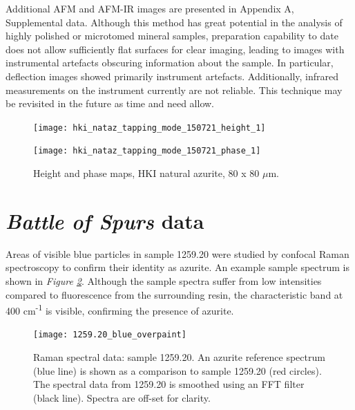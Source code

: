 Additional AFM and AFM-IR images are presented in Appendix A, Supplemental data. Although this method has great potential in the analysis of highly polished or microtomed mineral samples, preparation capability to date does not allow sufficiently flat surfaces for clear imaging, leading to images with instrumental artefacts obscuring information about the sample. In particular, deflection images showed primarily instrument artefacts. Additionally, infrared measurements on the instrument currently are not reliable. This technique may be revisited in the future as time and need allow.

\begin{figure}[H]
\centering
\begin{minipage}{.45\textwidth}
  \centering
  \texttt{[image: hki\_nataz\_tapping\_mode\_150721\_height\_1]}
\end{minipage}
\begin{minipage}{.45\textwidth}
  \centering
  \texttt{[image: hki\_nataz\_tapping\_mode\_150721\_phase\_1]}
\end{minipage}
\caption[Height and phase maps, HKI natural azurite]{Height and phase maps, HKI natural azurite, 80 x 80 $\mu$m.}
\label{fig:afm_hki_nataz_height_phase_1}
\end{figure}


\section[Battle of Spurs data]{\textit{Battle of Spurs} data}
\label{section3.5}

Areas of visible blue particles in sample 1259.20 were studied by confocal Raman spectroscopy to confirm their identity as azurite. An example sample spectrum is shown in \textit{Figure \ref{fig:raman_1259-20}}. Although the sample spectra suffer from low intensities compared to fluorescence from the surrounding resin, the characteristic band at 400 cm\textsuperscript{-1} is visible, confirming the presence of azurite.

\begin{figure}[H] %
\centering
  \texttt{[image: 1259.20\_blue\_overpaint]}
\caption[Raman spectral data, 1259.20]{Raman spectral data: sample 1259.20. An azurite reference spectrum (blue line) is shown as a comparison to sample 1259.20 (red circles). The spectral data from 1259.20 is smoothed using an FFT filter (black line). Spectra are off-set for clarity.}
\label{fig:raman_1259-20}
\end{figure}

